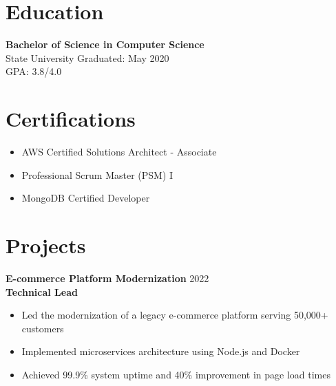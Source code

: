 \documentclass{classic}
\begin{document}
\section{Education}

\textbf{Bachelor of Science in Computer Science}\\
State University \hfill Graduated: May 2020\\
GPA: 3.8/4.0

\section{Certifications}
\begin{itemize}
    \item AWS Certified Solutions Architect - Associate
    \item Professional Scrum Master (PSM) I
    \item MongoDB Certified Developer
\end{itemize}

\section{Projects}

\textbf{E-commerce Platform Modernization} \hfill 2022\\
\textbf{Technical Lead}
\begin{itemize}
    \item Led the modernization of a legacy e-commerce platform serving 50,000+ customers
    \item Implemented microservices architecture using Node.js and Docker
    \item Achieved 99.9\% system uptime and 40\% improvement in page load times
\end{itemize}
\end{document}
